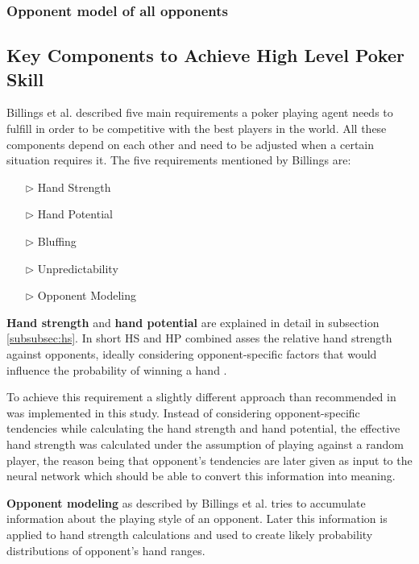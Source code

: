 \subsubsection{Opponent model of all opponents}
\subsection{Key Components to Achieve High Level Poker Skill}
Billings et al. \cite{challenge_of_poker} described five main requirements a poker playing agent needs to fulfill in order to be competitive with the best players in the world. All these components depend on each other and need to be adjusted when a certain situation requires it. The five requirements mentioned by Billings are:
\begin{itemize}
\item[$\triangleright$] Hand Strength
\item[$\triangleright$] Hand Potential
\item[$\triangleright$] Bluffing
\item[$\triangleright$] Unpredictability
\item[$\triangleright$] Opponent Modeling
\end{itemize}
\textbf{Hand strength} and \textbf{hand potential} are explained in detail in subsection \ref{subsubsec:hs}. In short HS and HP combined asses the relative hand strength against opponents, ideally considering opponent-specific factors that would influence the probability of winning a hand \cite{challenge_of_poker}. \par
To achieve this requirement a slightly different approach than recommended in \cite[p. 208]{challenge_of_poker} was implemented in this study. Instead of considering opponent-specific tendencies while calculating the hand strength and hand potential, the effective hand strength was calculated under the assumption of playing against a random player, the reason being that opponent's tendencies are later given as input to the neural network which should be able to convert this information into meaning.\par
\textbf{Opponent modeling} as described by Billings et al. \cite[p. 208]{challenge_of_poker} tries to accumulate information about the playing style of an opponent. Later this information is applied to hand strength calculations and used to create likely probability distributions of opponent's hand ranges. \par
